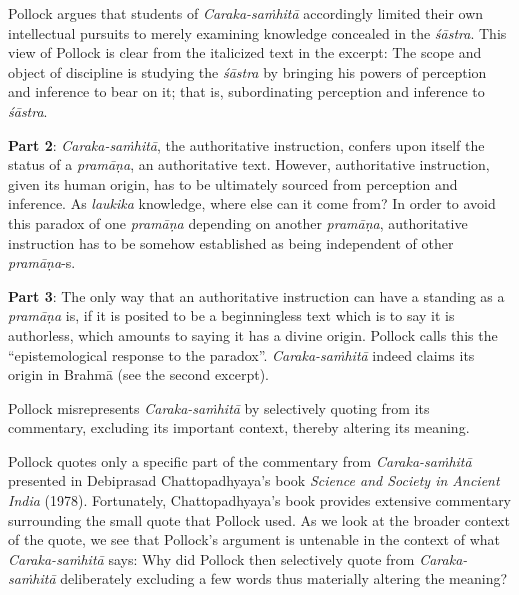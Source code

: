 Pollock argues that students of {\sl Caraka-saṁhitā} accordingly limited their own intellectual pursuits to merely examining knowledge concealed in the {\sl śāstra}.  This view of Pollock is clear from the italicized text in the excerpt: The scope and object of discipline is studying the {\sl śāstra} by bringing his powers of perception and inference to bear on it; that is, subordinating perception and inference to {\sl śāstra}.

{\bf Part 2}: {\sl Caraka-saṁhitā}, the authoritative instruction, confers upon itself the status of a {\sl pramāṇa}, an authoritative text.  However, authoritative instruction, given its human  origin, has to be ultimately sourced from perception and inference.  As {\sl laukika} knowledge, where else can it come from? In order to avoid this paradox of one {\sl pramāṇa} depending on another {\sl pramāṇa}, authoritative instruction has to be somehow established as being independent of other {\sl pramāṇa}-s.

{\bf Part 3}: The only way that an authoritative instruction can have a standing as a {\sl pramāṇa} is, if it is posited to be a beginningless text which is to say it is authorless, which amounts to saying it has a divine origin.  Pollock calls this the ``epistemological response to the paradox''. {\sl Caraka-saṁhitā} indeed claims its origin in Brahmā (see the second excerpt).

Pollock misrepresents {{\sl Caraka-saṁhitā}\relax} by selectively quoting from its commentary, excluding its important context, thereby altering its meaning.

Pollock quotes only a specific part of the commentary from {\sl Caraka-saṁhitā} presented in Debiprasad Chattopadhyaya's book {\sl Science and Society in Ancient India} (1978).  Fortunately, Chattopadhyaya's book provides extensive commentary surrounding the small quote that Pollock used. As we look at the broader context of the quote, we see that Pollock's argument is untenable in the context of what {\sl Caraka-saṁhitā} says: Why did Pollock then selectively quote from {\sl Caraka-saṁhitā} deliberately excluding a few words thus materially altering the meaning?

